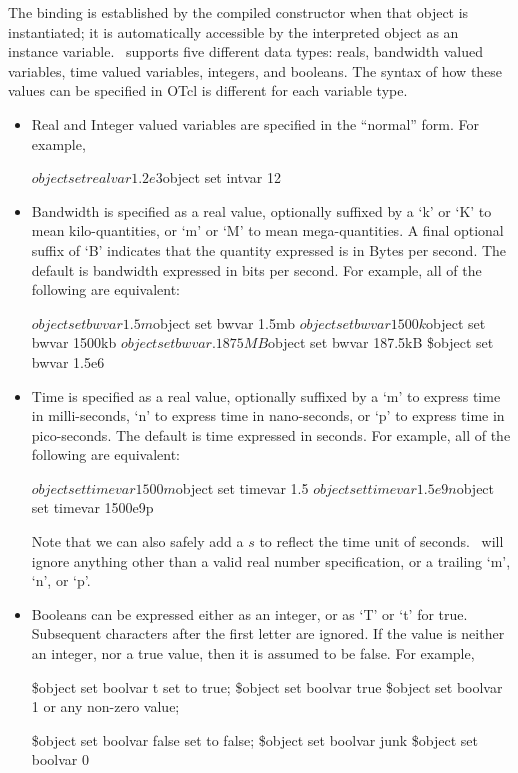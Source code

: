 The binding is established by the compiled constructor
when that object is instantiated;
it is automatically accessible by the interpreted object as 
an instance variable.
\ns\ supports five different data types: reals, bandwidth valued variables, 
time valued variables, integers, and booleans.
The syntax of how these values can be specified in OTcl is different
for each variable type.
\begin{itemize}\itemsep0pt
\item Real and Integer valued variables are specified in the ``normal'' form.
        For example,
        \begin{program}
        $object set realvar 1.2e3
        $object set intvar  12
        \end{program}
\item Bandwidth is specified as a real value, optionally
  suffixed by a `k' or `K' to mean kilo-quantities, or `m' or `M' to
  mean mega-quantities.
  A final optional suffix of `B' indicates that the quantity expressed
  is in Bytes per second.
  The default is bandwidth expressed in bits per second.
        For example, all of the following are equivalent:
        \begin{program}
        $object set bwvar 1.5m
        $object set bwvar 1.5mb
        $object set bwvar 1500k
        $object set bwvar 1500kb
        $object set bwvar .1875MB
        $object set bwvar 187.5kB
        \$object set bwvar 1.5e6
        \end{program}

\item Time is specified as a real value, optionally suffixed by a
  `m' to express time in milli-seconds, `n' to express time in
  nano-seconds, or `p' to express time in pico-seconds.
  The default is time expressed in seconds.
        For example, all of the following are equivalent:
        \begin{program}
        $object set timevar 1500m
        $object set timevar 1.5
        $object set timevar 1.5e9n
        $object set timevar 1500e9p
        \end{program}
  Note that we can also safely add a $s$ to reflect the time unit of seconds.
  \ns\ will ignore anything other than a valid real number specification,
  or a trailing `m', `n', or `p'.

\item Booleans can be expressed either as an integer, or as `T' or `t'
  for true.  Subsequent characters after the first letter are ignored.
  If the value is neither an integer, nor a true value,
  then it is assumed to be false.
        For example,
        \begin{program}
        \$object set boolvar t           \; set to true;
        \$object set boolvar true
        \$object set boolvar 1   \; or any non-zero value;

        \$object set boolvar false       \; set to false;
        \$object set boolvar junk        
        \$object set boolvar 0
        \end{program}

\end{itemize}

